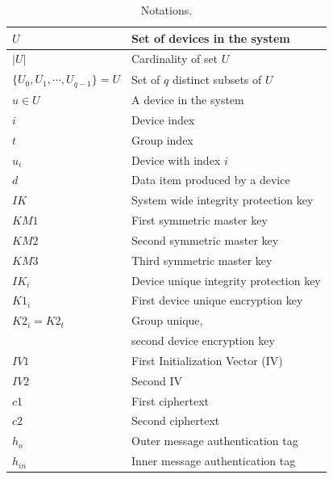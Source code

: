 {\begin{table}[th]
\caption{Notations.}
\label{tab:notations}
\begin{tabular}{||l|l||} \hline
$U$ & Set of devices in the system \\ \hline
$|U|$ & Cardinality of set $U$ \\ \hline
$\{U_0, U_1,\cdots, U_{q-1}\} = U$ & Set of $q$ distinct subsets of $U$ \\ \hline
$u \in U$ & A device in the system \\ \hline
$i$ & Device index \\ \hline
$t$ & Group index \\ \hline
$u_i$ & Device with index $i$ \\ \hline
$d$ & Data item produced by a device \\ \hline
$IK$ &  System wide integrity protection key \\ \hline
$KM1$ & First symmetric master key \\ \hline
$KM2$ & Second symmetric master key \\ \hline
$KM3$ & Third symmetric master key \\ \hline
$IK_i$ & Device unique integrity protection key \\ \hline
$K1_i$ & First device unique encryption key \\ \hline
$K2_i = K2_t$ & Group unique, \\
& second device encryption key \\ \hline
$IV1$  & First Initialization Vector (IV) \\ \hline
$IV2$ & Second IV \\ \hline
$c1$ & First ciphertext \\  \hline
$c2$ & Second ciphertext \\ \hline
$h_o$ & Outer message authentication tag \\ \hline
$h_{in}$ & Inner message authentication tag \\ \hline

\end{tabular}
\end{table}}
